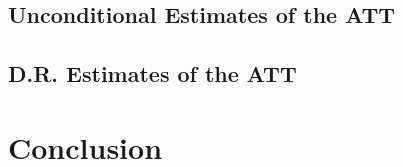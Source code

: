 \documentclass[12pt]{article}
\begin{document}
    \subsection{Unconditional Estimates of the ATT}

 

    \subsection{D.R. Estimates of the ATT}


    


\section{Conclusion} \label{sec:conclusion}





\clearpage

\onehalfspacing

%
\end{document}
